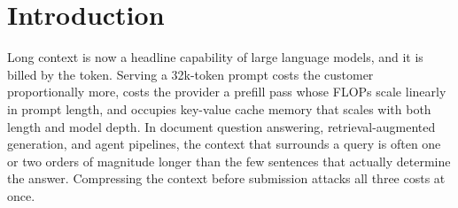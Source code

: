 \documentclass[pdflatex,sn-basic]{sn-jnl}
\theoremstyle{remark}
\begin{document}

\maketitle

\section{Introduction}
\label{sec:intro}

Long context is now a headline capability of large language models, and
it is billed by the token. Serving a 32k-token prompt costs the customer
proportionally more, costs the provider a prefill pass whose FLOPs scale
linearly in prompt length, and occupies key-value cache memory that
scales with both length and model depth. In document question
answering, retrieval-augmented generation, and agent pipelines, the
context that surrounds a query is often one or two orders of magnitude
longer than the few sentences that actually determine the answer.
Compressing the context before submission attacks all three costs at
once.
\end{document}

